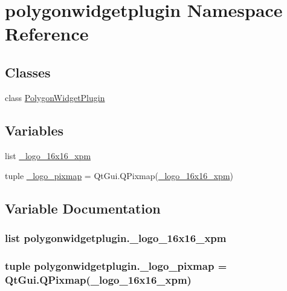 \hypertarget{namespacepolygonwidgetplugin}{}\section{polygonwidgetplugin Namespace Reference}
\label{namespacepolygonwidgetplugin}
\subsection*{Classes}
\begin{DoxyCompactItemize}
\item 
class \hyperlink{classpolygonwidgetplugin_1_1PolygonWidgetPlugin}{Polygon\+Widget\+Plugin}
\end{DoxyCompactItemize}
\subsection*{Variables}
\begin{DoxyCompactItemize}
\item 
list \hyperlink{namespacepolygonwidgetplugin_a26055f3519fef0c4b5deede65726f948}{\+\_\+logo\+\_\+16x16\+\_\+xpm}
\item 
tuple \hyperlink{namespacepolygonwidgetplugin_a3fa235f3493178640d951b9ceed1e1c6}{\+\_\+logo\+\_\+pixmap} = Qt\+Gui.\+Q\+Pixmap(\hyperlink{namespacepolygonwidgetplugin_a26055f3519fef0c4b5deede65726f948}{\+\_\+logo\+\_\+16x16\+\_\+xpm})
\end{DoxyCompactItemize}


\subsection{Variable Documentation}
\hypertarget{namespacepolygonwidgetplugin_a26055f3519fef0c4b5deede65726f948}{}
\subsubsection[{\+\_\+logo\+\_\+16x16\+\_\+xpm}]{\setlength{\rightskip}{0pt plus 5cm}list polygonwidgetplugin.\+\_\+logo\+\_\+16x16\+\_\+xpm}\label{namespacepolygonwidgetplugin_a26055f3519fef0c4b5deede65726f948}
\hypertarget{namespacepolygonwidgetplugin_a3fa235f3493178640d951b9ceed1e1c6}{}
\subsubsection[{\+\_\+logo\+\_\+pixmap}]{\setlength{\rightskip}{0pt plus 5cm}tuple polygonwidgetplugin.\+\_\+logo\+\_\+pixmap = Qt\+Gui.\+Q\+Pixmap({\bf \+\_\+logo\+\_\+16x16\+\_\+xpm})}\label{namespacepolygonwidgetplugin_a3fa235f3493178640d951b9ceed1e1c6}
